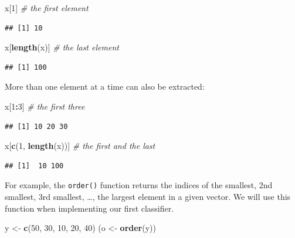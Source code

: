 \documentclass[10pt,b5paper,krantz1]{krantz}
\newenvironment{Shaded}{\begin{snugshade}}{\end{snugshade}}
\newcommand{\CommentTok}[1]{\textcolor[rgb]{0.37,0.37,0.37}{\textit{#1}}}
\newcommand{\DecValTok}[1]{\textcolor[rgb]{0.06,0.06,0.06}{#1}}
\newcommand{\KeywordTok}[1]{\textcolor[rgb]{0.27,0.27,0.27}{\textbf{#1}}}
\newcommand{\NormalTok}[1]{#1}
\newcommand{\OperatorTok}[1]{\textcolor[rgb]{0.43,0.43,0.43}{\textbf{#1}}}
\newcommand{\StringTok}[1]{\textcolor[rgb]{0.5,0.5,0.5}{#1}}
\begin{document}
\begin{Shaded}
\begin{Highlighting}[]
\NormalTok{x[}\DecValTok{1}\NormalTok{]         }\CommentTok{# the first element}
\end{Highlighting}
\end{Shaded}

\begin{verbatim}
## [1] 10
\end{verbatim}

\begin{Shaded}
\begin{Highlighting}[]
\NormalTok{x[}\KeywordTok{length}\NormalTok{(x)] }\CommentTok{# the last element}
\end{Highlighting}
\end{Shaded}

\begin{verbatim}
## [1] 100
\end{verbatim}

More than one element at a time can also be extracted:

\begin{Shaded}
\begin{Highlighting}[]
\NormalTok{x[}\DecValTok{1}\OperatorTok{:}\DecValTok{3}\NormalTok{] }\CommentTok{# the first three}
\end{Highlighting}
\end{Shaded}

\begin{verbatim}
## [1] 10 20 30
\end{verbatim}

\begin{Shaded}
\begin{Highlighting}[]
\NormalTok{x[}\KeywordTok{c}\NormalTok{(}\DecValTok{1}\NormalTok{, }\KeywordTok{length}\NormalTok{(x))] }\CommentTok{# the first and the last}
\end{Highlighting}
\end{Shaded}

\begin{verbatim}
## [1]  10 100
\end{verbatim}

For example, the \texttt{order()} function returns the indices of the
smallest, 2nd smallest, 3rd smallest, \ldots{}, the largest element in a given vector.
We will use this function when implementing our first classifier.

\begin{Shaded}
\begin{Highlighting}[]
\NormalTok{y <-}\StringTok{ }\KeywordTok{c}\NormalTok{(}\DecValTok{50}\NormalTok{, }\DecValTok{30}\NormalTok{, }\DecValTok{10}\NormalTok{, }\DecValTok{20}\NormalTok{, }\DecValTok{40}\NormalTok{)}
\NormalTok{(o <-}\StringTok{ }\KeywordTok{order}\NormalTok{(y))}
\end{Highlighting}
\end{Shaded}
\end{document}
